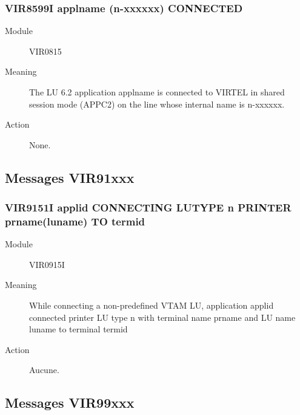 \documentclass[letterpaper,10pt,english]{sphinxmanual}
\begin{document}
\subsubsection{VIR8599I applname (n-xxxxxx) CONNECTED}
\label{\detokenize{messages:vir8599i-applname-n-xxxxxx-connected}}\begin{description}
\item[{Module}] \leavevmode
VIR0815

\item[{Meaning}] \leavevmode
The LU 6.2 application applname is connected to VIRTEL in shared session mode (APPC2) on the line whose internal name is n-xxxxxx.

\item[{Action}] \leavevmode
None.

\end{description}


\subsection{Messages VIR91xxx}
\label{\detokenize{messages:messages-vir91xxx}}

\subsubsection{VIR9151I applid CONNECTING LUTYPE n PRINTER prname(luname) TO termid}
\label{\detokenize{messages:vir9151i-applid-connecting-lutype-n-printer-prname-luname-to-termid}}\begin{description}
\item[{Module}] \leavevmode
VIR0915I

\item[{Meaning}] \leavevmode
While connecting a non-predefined VTAM LU, application applid connected printer LU type n with terminal name prname and LU name luname to terminal termid

\item[{Action}] \leavevmode
Aucune.

\end{description}


\subsection{Messages VIR99xxx}
\label{\detokenize{messages:messages-vir99xxx}}
\end{document}

